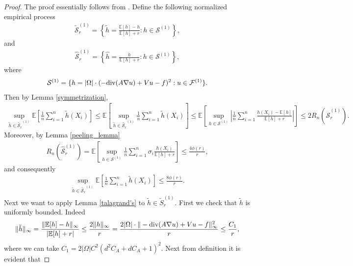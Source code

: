 \documentclass{article}
\newcommand{\E}{\mathbb{E}}
\newcommand{\F}{\mathcal{F}}
\renewcommand{\div}{\textnormal{div}}
\theoremstyle{plain}
\theoremstyle{definition}
\theoremstyle{remark}
\begin{document}
\begin{proof}
    The proof essentially follows from \citep[Theorem 4.14]{lu2021machine}. 
    Define the following normalized empirical process
    \begin{align*}
        \tilde{\mathcal{S}}_r^{(1)} = \left\{\tilde{h} = \frac{\E[h] - h}{\E[h]+r} : h \in \mathcal{S}^{(1)}  \right\},
    \end{align*}
    and
    \begin{align*}
        \hat{\mathcal{S}}_r^{(1)} = \left\{\hat{h} = \frac{ h}{\E[h]+r} : h \in \mathcal{S}^{(1)}  \right\},
    \end{align*}
    where 
    \begin{align*}
        \mathcal{S}^{(1)} = \{h = |\Omega| \cdot (-\div(A \nabla u) + V u - f)^2: u \in \F^{(1)}\}. 
    \end{align*}
    Then by Lemma \ref{symmetrization}, 
    \begin{align*}
         \sup_{\tilde{h} \in \tilde{\mathcal{S}_r}^{(1)}} \E \left[\frac{1}{n} \sum_{i=1}^{n} \tilde{h}(X_i)\right] \leq \E \left[ \sup_{\tilde{h} \in \tilde{\mathcal{S}_r}^{(1)}} \frac{1}{n} \sum_{i=1}^{n} \tilde{h}(X_i)\right] \leq \E \left[ \sup_{h \in \mathcal{S}^{(1)}} \left|\frac{1}{n} \sum_{i=1}^{n} \frac{h(X_i)- \E[h]}{\E[h] +r} \right|\right] \leq 2 R_{n} (\hat{\mathcal{S}}_{r}^{(1)}). 
    \end{align*}
    Moreover, by Lemma \ref{peeling_lemma}
    \begin{align*}
        R_{n} (\hat{\mathcal{S}}_{r}^{(1)}) = \E \left[\sup_{h \in \mathcal{S}^{(1)}} \frac{1}{n}\sum_{i=1}^{n} \sigma_i \frac{h(X_i)}{\E[h] + r}\right] \leq \frac{4 \phi(r)}{r},
    \end{align*}
    and consequently
    \begin{align*}
        \sup_{\tilde{h} \in \tilde{\mathcal{S}_r}^{(1)}} \E \left[\frac{1}{n} \sum_{i=1}^{n} \tilde{h}(X_i)\right] \leq \frac{8 \phi(r)}{r}. 
    \end{align*}
    Next we want to apply Lemma \ref{talagrand's} to $ \tilde{h} \in \tilde{S}_r^{(1)}$. First we check  that  $\tilde{h}$ is uniformly bounded. Indeed 
    \begin{align*}
        \|\tilde{h}\|_\infty = \frac{\|\E[h] - h\|_\infty}{|\E[h] + r|} \leq \frac{2 \|h\|_\infty}{r} = \frac{2|\Omega| \cdot \|-\div(A \nabla u) + V u - f\|_\infty^2}{r} \leq \frac{C_1}{r}, 
    \end{align*}
    where we can take $C_1 = 2 |\Omega| C^2 (d^2 C_A  + d C_A  + 1)^2$. 
    Next from definition it is evident that 

\end{proof}
\end{document}
